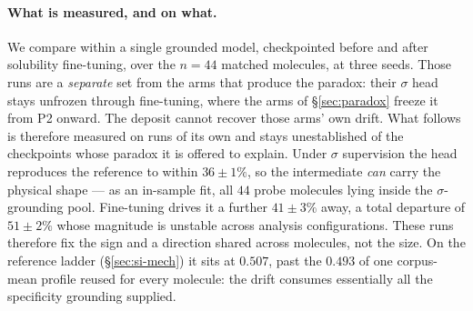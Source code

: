 \paragraph{What is measured, and on what.} We compare within a single grounded model, checkpointed
before and after solubility fine-tuning, over the $n{=}44$ matched molecules, at three seeds. Those
runs are a \emph{separate} set from the arms that produce the paradox: their $\sigma$ head stays
unfrozen through fine-tuning, where the arms of \S\ref{sec:paradox} freeze it from P2 onward. The
deposit cannot recover those arms' own drift. What follows is therefore measured on runs of its own and stays
unestablished of the checkpoints whose paradox it is offered to explain. Under $\sigma$ supervision
the head reproduces the reference to within $36\pm1\%$, so the intermediate \emph{can} carry the
physical shape --- as an in-sample fit, all $44$ probe molecules lying inside the $\sigma$-grounding
pool. Fine-tuning drives it a further $41\pm3\%$ away, a total departure of $51\pm2\%$ whose
magnitude is unstable across analysis configurations. These runs therefore fix the sign and a
direction shared across molecules, not the size. On the reference ladder (\S\ref{sec:si-mech}) it
sits at $0.507$, past the $0.493$ of one corpus-mean profile reused for every molecule: the drift
consumes essentially all the specificity grounding supplied.

